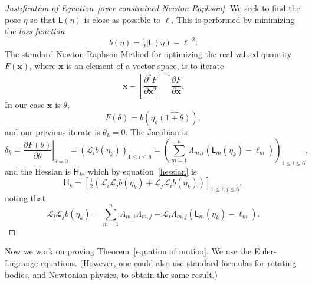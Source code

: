\documentclass[reqno,12pt]{amsart}
\newcommand{\liederiv}{\mathcal L}
\begin{document}
\begin{proof}[Justification of Equation~\eqref{over constrained Newton-Raphson}]
We seek to find the pose $\eta$ so that $\mathsf L(\eta)$ is close as possible to $\bm\ell$.  This is performed by minimizing the \emph{loss function}
\begin{equation}
b(\eta) = \tfrac12 {|\mathsf L(\eta) - \bm\ell|}^2 .
\end{equation}
The standard Newton-Raphson Method for optimizing the real valued quantity $F(\bm x)$, where $\bm x$ is an element of a vector space, is to iterate
\begin{equation}
\bm x - \left[\frac{\partial^2 F}{\partial \bm x^2}\right]^{-1} \frac{\partial F}{\partial \bm x} .
\end{equation}
In our case $\bm x$ is $\theta$,
\begin{equation}
F(\theta) = b(\eta_k\widehat{(1+\theta)}),
\end{equation}
and our previous iterate is $\theta_k = 0$.  The Jacobian is
\begin{equation}
\label{jacobian}
\delta_k = \left.\frac{\partial F(\theta)}{\partial\theta} \right|_{\theta = 0} = (\liederiv_i b(\eta_k))_{1 \le i \le 6}
= \left(\sum_{m=1}^n \mathsf \Lambda_{m,i} (\mathsf L_m(\eta_k) - \ell_m)\right)_{1 \le i \le 6},
\end{equation}
and the Hessian is $\mathsf H_k$, which by equation~\eqref{hessian} is
\begin{equation}
\mathsf H_k
= \left[\tfrac12 (\liederiv_i \liederiv_j b(\eta_k) + \liederiv_j \liederiv_i b(\eta_k)) \right]_{1\le i,j\le 6},
\end{equation}
noting that
\begin{equation}
\liederiv_i \liederiv_j b(\eta_k) = \sum_{m=1}^n \mathsf\Lambda_{m,i} \mathsf\Lambda_{m,j} + \mathcal L_i \mathsf \Lambda_{m,j} (\mathsf L_m(\eta_k) - \ell_m) .
\end{equation}
\end{proof}


\bigskip

Now we work on proving Theorem~\ref{equation of motion}.  We use the Euler-Lagrange equations.  (However, one could also use standard formulas for rotating bodies, and Newtonian physics, to obtain the same result.)
\end{document}
